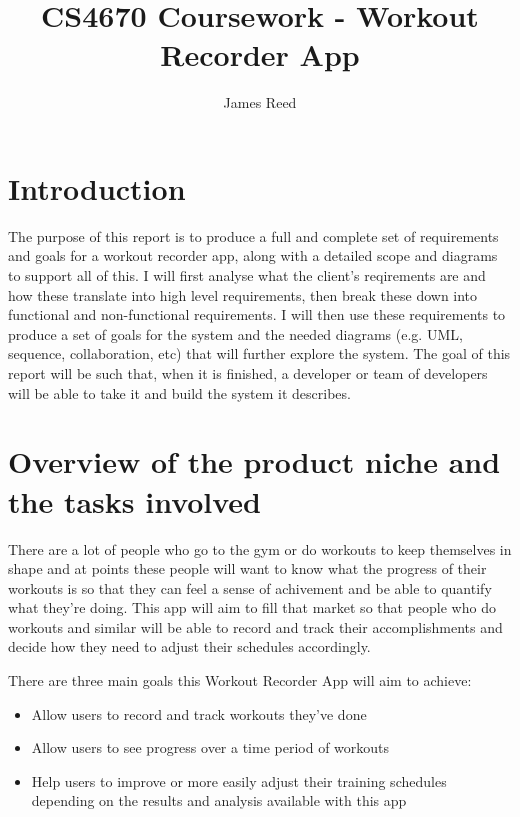 \documentclass{article}
\begin{document}
\title{CS4670 Coursework - Workout Recorder App}
\author{James Reed}
\maketitle
\newpage
\tableofcontents

\newpage
\renewcommand\thesection{\arabic{section}}

\section{Introduction}

The purpose of this report is to produce a full and complete set of requirements and goals for a workout recorder app, along with a detailed scope and diagrams to support all of this. I will first analyse what the client's reqirements are and how these translate into high level requirements, then break these down into functional and non-functional requirements. I will then use these requirements to produce a set of goals for the system and the needed diagrams (e.g. UML, sequence, collaboration, etc) that will further explore the system. The goal of this report will be such that, when it is finished, a developer or team of developers will be able to take it and build the system it describes.

\section{Overview of the product niche and the tasks involved}

There are a lot of people who go to the gym or do workouts to keep themselves in shape and at points these people will want to know what the progress of their workouts is so that they can feel a sense of achivement and be able to quantify what they're doing. This app will aim to fill that market so that people who do workouts and similar will be able to record and track their accomplishments and decide how they need to adjust their schedules accordingly.

There are three main goals this Workout Recorder App will aim to achieve:

\begin{itemize}

	\item Allow users to record and track workouts they've done
	\item Allow users to see progress over a time period of workouts
	\item Help users to improve or more easily adjust their training schedules depending on the results and analysis available with this app

\end{itemize}
\end{document}
